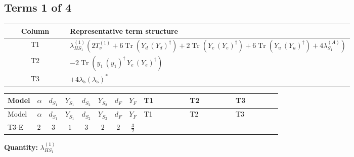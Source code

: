 \documentclass[8pt]{article}
\begin{document}
\begin{landscape}
\subsection*{Terms 1 of 4}
\begin{center}
\begin{tabular}{@{}c >{\raggedright\arraybackslash}p{0.82\linewidth}@{}}
\toprule
Column & Representative term structure \\
\midrule
T1 & \(\displaystyle {\lambda_{HS_1}^{(1)}} (2 T_{\nu}^{(1)}+6 \operatorname{Tr}\!\left({Y_d}\,\left({Y_d}\right)^{\dagger}\right)+2 \operatorname{Tr}\!\left({Y_e}\,\left({Y_e}\right)^{\dagger}\right)+6 \operatorname{Tr}\!\left({Y_u}\,\left({Y_u}\right)^{\dagger}\right)+4 {\lambda_{S_1}^{(A)}})\) \\
\midrule
T2 & \(\displaystyle -2 \operatorname{Tr}\!\left({y_1}\,\left({y_1}\right)^{\dagger}\,{Y_e}\,\left({Y_e}\right)^{\dagger}\right)\) \\
\midrule
T3 & \(\displaystyle +4 {\lambda_5} \left({\lambda_5}\right)^{*}\) \\
\midrule
\bottomrule
\end{tabular}
\end{center}
\smallskip
\tiny
\begin{longtable}{@{}llcccccc >{\raggedright\arraybackslash}p{0.21\linewidth} >{\raggedright\arraybackslash}p{0.21\linewidth} >{\raggedright\arraybackslash}p{0.21\linewidth}@{}}
\toprule
Model & $\alpha$ & $d_{S_1}$ & $Y_{S_1}$ & $d_{S_2}$ & $Y_{S_2}$ & $d_F$ & $Y_F$ & T1 & T2 & T3 \\
\midrule
\endfirsthead
\toprule
Model & $\alpha$ & $d_{S_1}$ & $Y_{S_1}$ & $d_{S_2}$ & $Y_{S_2}$ & $d_F$ & $Y_F$ & T1 & T2 & T3 \\
\midrule
\endhead
T3-E & $2$ & $3$ & $1$ & $3$ & $2$ & $2$ & $\frac{3}{2}$ & \scriptsize\adjustbox{max width=\linewidth}{$\begin{gathered} {\lambda_{HS_1}^{(1)}} (2 T_{\nu}^{(1)}+6 \operatorname{Tr}\!\left({Y_d}\,\left({Y_d}\right)^{\dagger}\right)+2 \operatorname{Tr}\!\left({Y_e}\,\left({Y_e}\right)^{\dagger}\right)+6 \operatorname{Tr}\!\left({Y_u}\,\left({Y_u}\right)^{\dagger}\right)+4 {\lambda_{S_1}^{(A)}})\end{gathered}$} & \scriptsize\adjustbox{max width=\linewidth}{$\begin{gathered} -2 \operatorname{Tr}\!\left({y_1}\,\left({y_1}\right)^{\dagger}\,{Y_e}\,\left({Y_e}\right)^{\dagger}\right)\end{gathered}$} & \scriptsize\adjustbox{max width=\linewidth}{$\begin{gathered} +4 {\lambda_5} \left({\lambda_5}\right)^{*}\end{gathered}$} \\
\midrule
\bottomrule
\end{longtable}
\clearpage
\noindent\textbf{Quantity: }$\lambda_{HS_1}^{(1)}$\par\smallskip

\end{landscape}
\end{document}
